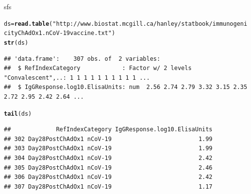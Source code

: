 \documentclass{beamer}\usepackage[]{graphicx}\usepackage[]{color}
\makeatletter
\newcommand{\hlstr}[1]{\textcolor[rgb]{0.192,0.494,0.8}{#1}}%
\newcommand{\hlstd}[1]{\textcolor[rgb]{0.345,0.345,0.345}{#1}}%
\newcommand{\hlkwb}[1]{\textcolor[rgb]{0.69,0.353,0.396}{#1}}%
\newcommand{\hlkwd}[1]{\textcolor[rgb]{0.737,0.353,0.396}{\textbf{#1}}}%
\newenvironment{kframe}{%
 \def\at@end@of@kframe{}%
 \ifinner\ifhmode%
  \def\at@end@of@kframe{\end{minipage}}%
  \begin{minipage}{\columnwidth}%
 \fi\fi%
 \def\FrameCommand##1{\hskip\@totalleftmargin \hskip-\fboxsep
 \colorbox{shadecolor}{##1}\hskip-\fboxsep
     \hskip-\linewidth \hskip-\@totalleftmargin \hskip\columnwidth}%
 \MakeFramed {\advance\hsize-\width
   \@totalleftmargin\z@ \linewidth\hsize
   \@setminipage}}%
 {\par\unskip\endMakeFramed%
 \at@end@of@kframe}
\newenvironment{knitrout}{}{} %
\makeatother
\begin{document}
\begin{frame}[fragile]{sfs}
\begin{knitrout}\scriptsize
{}\color{fgcolor}\begin{kframe}
\begin{alltt}
\hlstd{ds}\hlkwb{=}\hlkwd{read.table}\hlstd{(}\hlstr{"http://www.biostat.mcgill.ca/hanley/statbook/immunogenicityChAdOx1.nCoV-19vaccine.txt"}\hlstd{)}
\hlkwd{str}\hlstd{(ds)}
\end{alltt}
\begin{verbatim}
## 'data.frame':	307 obs. of  2 variables:
##  $ RefIndexCategory            : Factor w/ 2 levels "Convalescent",..: 1 1 1 1 1 1 1 1 1 1 ...
##  $ IgGResponse.log10.ElisaUnits: num  2.56 2.74 2.79 3.32 3.15 2.35 2.72 2.95 2.42 2.64 ...
\end{verbatim}
\begin{alltt}
\hlkwd{tail}\hlstd{(ds)}
\end{alltt}
\begin{verbatim}
##             RefIndexCategory IgGResponse.log10.ElisaUnits
## 302 Day28PostChAdOx1 nCoV-19                         1.99
## 303 Day28PostChAdOx1 nCoV-19                         1.99
## 304 Day28PostChAdOx1 nCoV-19                         2.42
## 305 Day28PostChAdOx1 nCoV-19                         2.46
## 306 Day28PostChAdOx1 nCoV-19                         2.42
## 307 Day28PostChAdOx1 nCoV-19                         1.17
\end{verbatim}
\end{kframe}
\end{knitrout}
\end{frame}


	
\end{document}
